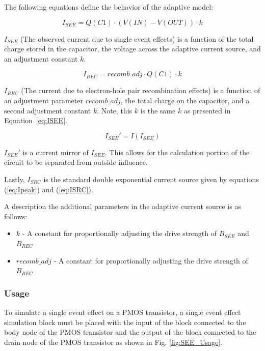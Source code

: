 \documentclass[conference]{IEEEtran}
\begin{document}
    The following equations define the behavior of the adaptive model:

    \begin{equation}
        I_{SEE} = Q(C1) \cdot (V(IN) - V(OUT)) \cdot k\label{eq:ISEE}
    \end{equation}

    \(I_{SEE}\) (The observed current due to single event effects) is a function of the total charge stored in the capacitor, the voltage across the adaptive current source, and an adjustment constant \(k\).

    \begin{equation}
        I_{REC} = recomb\_adj \cdot Q(C1) \cdot k\label{eq:IREC}
    \end{equation}

    \(I_{REC}\) (The current due to electron-hole pair recombination effects) is a function of an adjustment parameter \(recomb\_adj\), the total charge on the capacitor, and a second adjustment constant \(k\).
    Note, this \(k\) is the same \(k\) as presented in Equation~\ref{eq:ISEE}.

    \begin{equation}
        I_{SEE}' = I(I_{SEE})\label{eq:ISEE'}
    \end{equation}

    \(I_{SEE}'\) is a current mirror of \(I_{SEE}\).
    This allows for the calculation portion of the circuit to be separated from outside influence.

    Lastly, \(I_{SRC}\) is the standard double exponential current source given by equations (\ref{eq:Ipeak}) and (\ref{eq:ISRC}).

    A description the additional parameters in the adaptive current source is as follows:

    \begin{itemize}
        \item[] \(k\) - A constant for proportionally adjusting the drive strength of \(B_{SEE}\) and \(B_{REC}\)

        \item[] \(recomb\_adj\) - A constant for proportionally adjusting the drive strength of \(B_{REC}\)

    \end{itemize}
    \vspace{1em}

    \subsubsection{Usage}
    To simulate a single event effect on a PMOS transistor, a single event effect simulation block must be placed with the input of the block connected to the body node of the PMOS transistor and the output of the block connected to the drain node of the PMOS transistor as shown in Fig. \ref{fig:SEE_Usage}.
\end{document}
